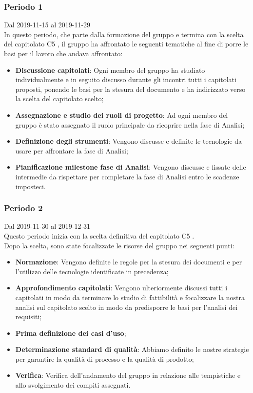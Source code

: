 \subsubsection{Periodo 1} 
Dal 2019-11-15 al 2019-11-29\\
In questo periodo, che parte dalla formazione del gruppo e termina con la scelta del capitolato C5 \NomeProgetto{}, il gruppo ha affrontato le seguenti tematiche al fine di porre le basi per il lavoro che andava affrontato:
\begin{itemize}
	\item \textbf{Discussione capitolati}: Ogni membro del gruppo ha studiato individualmente e in seguito discusso durante gli incontri tutti i capitolati proposti, ponendo le basi per la stesura del documento \SdF{} e ha indirizzato verso la scelta del capitolato scelto;
	\item \textbf{Assegnazione e studio dei ruoli di progetto}: Ad ogni membro del gruppo è stato assegnato il ruolo principale da ricoprire nella fase di Analisi;
	\item \textbf{Definizione degli strumenti}: Vengono discusse e definite le tecnologie da usare per affrontare la fase di Analisi;
	\item \textbf{Pianificazione milestone fase di Analisi}: Vengono discusse e fissate delle  intermedie da rispettare per completare la fase di Analisi entro le scadenze imposteci.
\end{itemize}
\subsubsection{Periodo 2} 
Dal 2019-11-30 al 2019-12-31\\
Questo periodo inizia con la scelta definitiva del capitolato C5 \NomeProgetto{}.\\
Dopo la scelta, sono state focalizzate le risorse del gruppo nei seguenti punti:
\begin{itemize}
	\item \textbf{Normazione}: Vengono definite le regole per la stesura dei documenti e per l'utilizzo delle tecnologie identificate in precedenza;
	\item \textbf{Approfondimento capitolati}: Vengono ulteriormente discussi tutti i capitolati in modo da terminare lo studio di fattibilità e focalizzare la nostra analisi sul capitolato scelto in modo da predisporre le basi per l'analisi dei requisiti;
	\item \textbf{Prima definizione dei casi d'uso};
	\item \textbf{Determinazione standard di qualità}: Abbiamo definito le nostre strategie per garantire la qualità di processo e la qualità di prodotto;
	\item \textbf{Verifica}: Verifica dell'andamento del gruppo in relazione alle tempistiche e allo svolgimento dei compiti assegnati.
\end{itemize}
